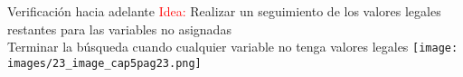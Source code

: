 \begin{frame}{Verificación hacia adelante}
\textcolor{red}{Idea:} Realizar un seguimiento de los valores legales restantes para las variables no asignadas\\
Terminar la búsqueda cuando cualquier variable no tenga valores legales
\texttt{[image: images/23\_image\_cap5pag23.png]}
\end{frame}
 